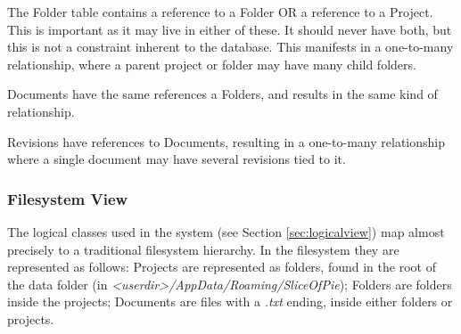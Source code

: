 The Folder table contains a reference to a Folder OR a reference to a Project. This is important as
it may live in either of these. It should never have both, but this is not a constraint inherent to
the database. This manifests in a one-to-many relationship, where a parent project or folder may have
many child folders.

Documents have the same references a Folders, and results in the same kind of relationship.

Revisions have references to Documents, resulting in a one-to-many relationship where a single document
may have several revisions tied to it.

\subsubsection{Filesystem View}
The logical classes used in the system (see Section \ref{sec:logicalview}) map almost precisely to a
traditional filesystem hierarchy. In the filesystem they are represented as follows: Projects are
represented as folders, found in the root of the data folder (in \emph{<userdir>/AppData/Roaming/SliceOfPie});
Folders are folders inside the projects; Documents are files with a \emph{.txt} ending, inside either folders
or projects.
